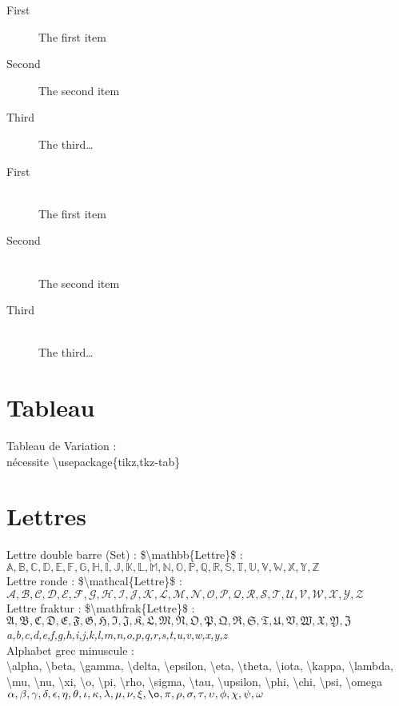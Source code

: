 \documentclass{article}
\begin{document}
\begin{description}
\item[First] The first item
\item[Second] The second item
\item[Third] The third\ldots
\end{description}

\begin{description}
\item[First] \hfill \\
The first item
\item[Second] \hfill \\
The second item
\item[Third] \hfill \\
The third\ldots
\end{description}
\section{Tableau}
Tableau de Variation :\\
nécessite \textbackslash usepackage\{tikz,tkz-tab\}\\

\section{Lettres}
Lettre double barre (Set) : \$\textbackslash mathbb\{Lettre\}\$ :\\
$\mathbb{A,B,C,D,E,F,G,H,I,J,K,L,M,N,O,P,Q,R,S,T,U,V,W,X,Y,Z}$\\
Lettre ronde : \$\textbackslash mathcal\{Lettre\}\$ :\\
$\mathcal{A,B,C,D,E,F,G,H,I,J,K,L,M,N,O,P,Q,R,S,T,U,V,W,X,Y,Z}$\\
Lettre fraktur : \$\textbackslash mathfrak\{Lettre\}\$ :\\
$\mathfrak{A,B,C,D,E,F,G,H,I,J,K,L,M,N,O,P,Q,R,S,T,U,V,W,X,Y,Z}$\\
\emph{a,b,c,d,e,f,g,h,i,j,k,l,m,n,o,p,q,r,s,t,u,v,w,x,y,z}\\
Alphabet grec minuscule :\\
\textbackslash alpha, \textbackslash beta, \textbackslash gamma, \textbackslash delta, \textbackslash epsilon, \textbackslash eta, \textbackslash theta, \textbackslash iota, \textbackslash kappa, \textbackslash lambda, \textbackslash mu, \textbackslash nu, \textbackslash xi, \textbackslash o, \textbackslash pi, \textbackslash rho, \textbackslash sigma, \textbackslash tau, \textbackslash upsilon, \textbackslash phi, \textbackslash chi, \textbackslash psi, \textbackslash omega\\
$\alpha, \beta, \gamma, \delta, \epsilon, \eta, \theta, \iota, \kappa, \lambda, \mu, \nu, \xi, \o, \pi, \rho, \sigma, \tau, \upsilon, \phi, \chi, \psi, \omega$\\
\end{document}
